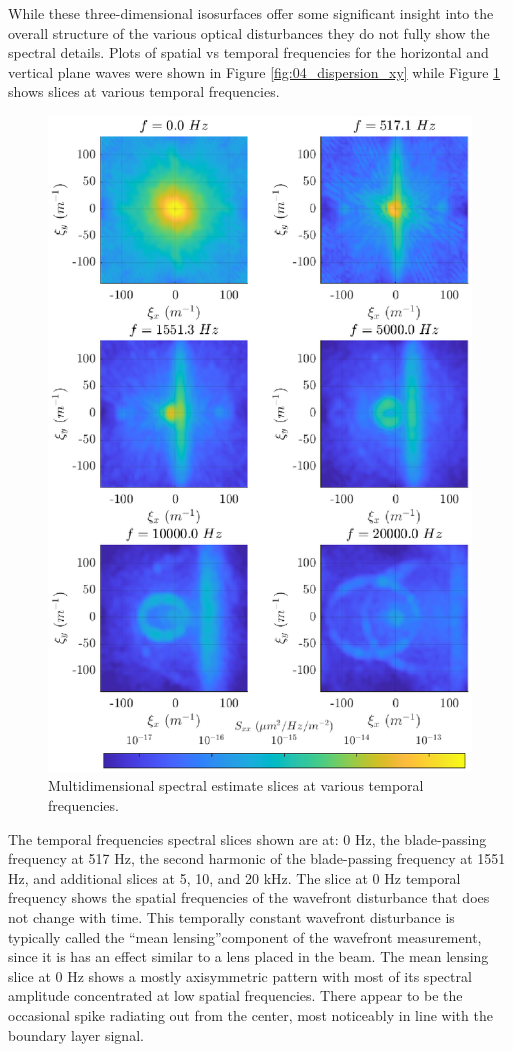 While these three-dimensional isosurfaces offer some significant insight into the overall structure of the various optical disturbances they do not fully show the spectral details.
Plots of spatial vs temporal frequencies for the horizontal and vertical plane waves were shown in Figure \ref{fig:04_dispersion_xy} while Figure \ref{fig:04_dispersion_slices} shows slices at various temporal frequencies.
\begin{figure}
  \centering
  \includegraphics{../matlab/04_dispersion_analysis/dispersion_slices.eps}
  \caption{Multidimensional spectral estimate slices at various temporal frequencies.}
  \label{fig:04_dispersion_slices}
\end{figure}
The temporal frequencies spectral slices shown are at: 0 Hz, the blade-passing frequency at 517 Hz, the second harmonic of the blade-passing frequency at 1551 Hz, and additional slices at 5, 10, and 20 kHz.
The slice at 0 Hz temporal frequency shows the spatial frequencies of the wavefront disturbance that does not change with time.
This temporally constant wavefront disturbance is typically called the ``mean lensing''component of the wavefront measurement, since it is has an effect similar to a lens placed in the beam.
The mean lensing slice at 0 Hz shows a mostly axisymmetric pattern with most of its spectral amplitude concentrated at low spatial frequencies.
There appear to be the occasional spike radiating out from the center, most noticeably in line with the boundary layer signal.

